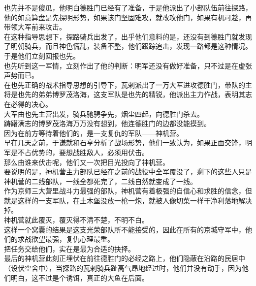 \begin{multicols}{\theparacolNo}
也先并不是傻瓜，他明白德胜门已经有了准备，于是他派出了小部队伍前往探路，他的如意算盘是先探明形势，如果该门坚固难攻，就改攻他门，如果有机可趁，再带领大军前来攻击。\\

在这种指导思想下，探路骑兵出发了，出乎他们意料的是，还没有到德胜门就发现了明朝骑兵，而且神色慌乱，装备不整，他们跟踪追击，发现一路都是这种情况。于是他们立刻回报也先。\\

也先听到这一军情，立刻作出了他的判断：明军还没有做好准备，只不过是在虚张声势而已。\\

在也先正确的战术指导思想的引导下，瓦剌派出了一万大军进攻德胜门，带队的主将是也先的弟弟博罗茂洛海，这支军队是也先的精锐，他派出主力作战，表明其志在必得的决心。\\

大军由也先主营出发，骑兵驰骋争先，烟尘四起，向德胜门杀去。\\

踌躇满志的博罗茂洛海万万没有想到，他连德胜门的边都没能摸到。\\

因为在前方等待着他们的，是一支复仇的军队——神机营。\\

早在几天之前，于谦就和石亨分析了战场形势，他们一致认为，如果正面交锋，明军是不占优势的，要想战胜敌人，必须用伏击。\\

那么由谁来伏击呢，他们又一次把目光投向了神机营。\\

要说明的是，神机营主力部队已经在之前的战役中全军覆没了，剩下的这些人只是神机营的二线部队，一线全都死完了，二线自然就变成了一线。\\

作为京师三大营里战斗力最强的部队，神机营有着极强的自信心和求胜的信念，但就是这样的一支军队，在土木堡没放一枪一炮，就被人像切菜一样干净利落地解决掉。\\

神机营就此覆灭，覆灭得不清不楚，不明不白。\\

这样一个窝囊的结果是这支光荣部队所不能接受的，因此在所有的京城守军中，他们的求战欲望最强，复仇心理最重。\\

把任务交给他们，实在是最为合适的抉择。\\

最后的神机营此刻正埋伏在前往德胜门的必经之路上，他们隐蔽在沿路的民居中（设伏空舍中），当探路的瓦剌骑兵趾高气昂地经过时，他们并没有动手，因为他们明白，这不过是个诱饵，真正的大鱼在后面。\\


\end{multicols}
